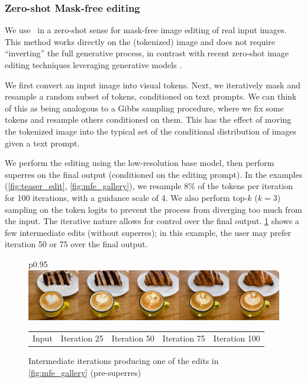 \subsubsection{Zero-shot Mask-free editing}
We use \name~in a zero-shot sense for mask-free image editing of real input images. This method works directly on the (tokenized) image and does not require ``inverting'' the full generative process, in contrast with recent zero-shot image editing techniques leveraging generative models \citep{gal2022stylegan,patashnik2021styleclip,kim2022diffusionclip,nulltext2022}. 

We first convert an input image into visual tokens. Next, we iteratively mask and resample a random subset of tokens, conditioned on text prompts. We can think of this as being analogous to a Gibbs sampling procedure, where we fix some tokens and resample others conditioned on them. This has the effect of moving the tokenized image into the typical set of the conditional distribution of images given a text prompt. 

We perform the editing using the low-resolution base model, then perform superres on the final output (conditioned on the editing prompt). In the examples (\cref{fig:teaser_edit}, \cref{fig:mfe_gallery}), we resample 8\% of the tokens per iteration for 100 iterations, with a guidance scale of 4. We also perform top-$k$ ($k=3$) sampling on the token logits to prevent the process from diverging too much from the input. The iterative nature allows for control over the final output. \cref{fig:edit_iter} shows a few intermediate edits (without superres); in this example, the user may prefer iteration 50 or 75 over the final output.



\begin{figure}
    \centering
  \begin{tabular}{p{}}
  \hspace{5mm}
    \includegraphics[width=150mm]{figs/mfe/18_seed_0_timeline}\\ 
    \hspace{5mm}
    \begin{tabularx}{150mm}{p{25mm}p{25mm}p{25mm}p{25mm}p{25mm}}
    Input  &
    Iteration 25 &
    Iteration 50 &
    Iteration 75 &
    Iteration 100
    \end{tabularx}
  \end{tabular}
    \caption{Intermediate iterations producing one of the edits in \cref{fig:mfe_gallery} (pre-superres)}
    \label{fig:edit_iter}
\end{figure}

